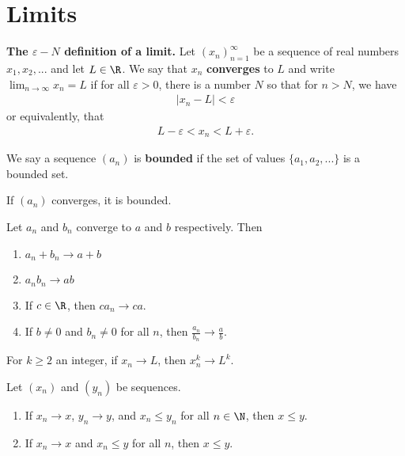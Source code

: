\documentclass{article}
\begin{document}
\section{Limits}
\begin{definition}
    \textbf{The $\varepsilon-N$ definition of a limit.} Let $(x_n)^\infty_{n=1}$ be a sequence of real numbers $x_1,x_2,...$ and let $L\in\R$. We say that $x_n$ \textbf{converges} to $L$ and write $\lim_{n\to\infty}x_n=L$ if for all $\varepsilon>0$, there is a number $N$ so that for $n>N$, we have
    \begin{align*}
        |x_n-L|<\varepsilon
    \end{align*}
    or equivalently, that
    \begin{align*}
        L-\varepsilon<x_n<L+\varepsilon.
    \end{align*}
\end{definition}
\begin{definition}
    We say a sequence $(a_n)$ is \textbf{bounded} if the set of values $\{a_1, a_2, ...\}$ is a bounded set.
\end{definition}
\begin{theorem}
    If $(a_n)$ converges, it is bounded.
\end{theorem}
\begin{theorem}
    Let $a_n$ and $b_n$ converge to $a$ and $b$ respectively. Then
    \begin{enumerate}
        \item $a_n+b_n\to a+b$
        \item $a_nb_n\to ab$
        \item If $c\in\R$, then $ca_n\to ca$.
        \item If $b\not=0$ and $b_n\not=0$ for all $n$, then $\frac{a_n}{b_n}\to\frac{a}{b}$.
    \end{enumerate}
\end{theorem}
\begin{theorem}
    For $k\geq2$ an integer, if $x_n\to L$, then $x^k_n\to L^k$.
\end{theorem}
\begin{theorem}
    Let $(x_n)$ and $(y_n)$ be sequences.
    \begin{enumerate}
        \item If $x_n\to x$, $y_n\to y$, and $x_n\leq y_n$ for all $n\in\N$, then $x\leq y$.
        \item If $x_n\to x$ and $x_n\leq y$ for all $n$, then $x\leq y$.
    \end{enumerate}
\end{theorem}
\end{document}
